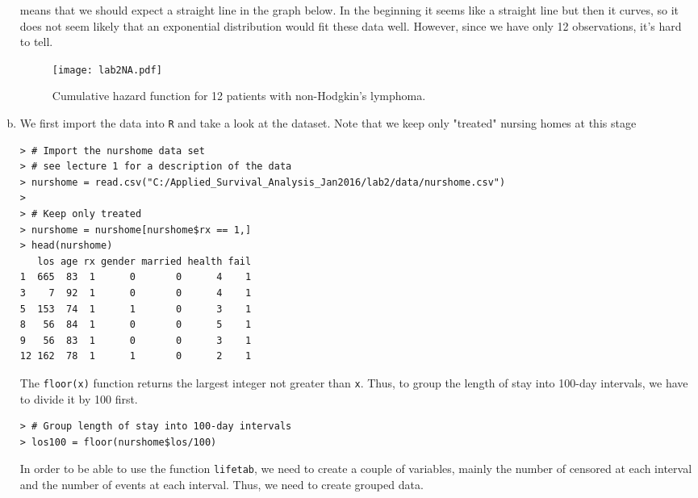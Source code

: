 \begin{enumerate}[(a)]
means that we should expect a straight line in the graph below. In the beginning it seems 
like a straight line but then it curves, so it does not seem likely that an exponential 
distribution would fit these data well. However, since we have only 12 observations, it's hard to tell.
\begin{figure}[htbp]
	\centering
		\texttt{[image: lab2NA.pdf]}
	\caption{Cumulative hazard function for 12 patients
with non-Hodgkin’s lymphoma.}
	\label{figure2}
\end{figure}
\item We first import the data into \verb|R| and take a look at the dataset. Note that we keep only "treated" nursing homes at this stage
\begin{spacing}{1.2}
\begin{footnotesize}
\begin{verbatim}
> # Import the nurshome data set
> # see lecture 1 for a description of the data
> nurshome = read.csv("C:/Applied_Survival_Analysis_Jan2016/lab2/data/nurshome.csv")
> 
> # Keep only treated 
> nurshome = nurshome[nurshome$rx == 1,]
> head(nurshome)
   los age rx gender married health fail
1  665  83  1      0       0      4    1
3    7  92  1      0       0      4    1
5  153  74  1      1       0      3    1
8   56  84  1      0       0      5    1
9   56  83  1      0       0      3    1
12 162  78  1      1       0      2    1
\end{verbatim}
\end{footnotesize}
\end{spacing}
The \verb|floor(x)| function returns the largest integer not greater than \verb|x|. Thus, to group the length of stay into 100-day intervals, we have to divide it by 100 first.
\begin{spacing}{1.2}
\begin{footnotesize}
\begin{verbatim}
> # Group length of stay into 100-day intervals
> los100 = floor(nurshome$los/100)
\end{verbatim}
\end{footnotesize}
\end{spacing}
In order to be able to use the function \verb|lifetab|, we need to create a couple of variables, mainly the number of censored at each interval and the number of events at each interval. Thus, we need to create grouped data.


\end{enumerate}
